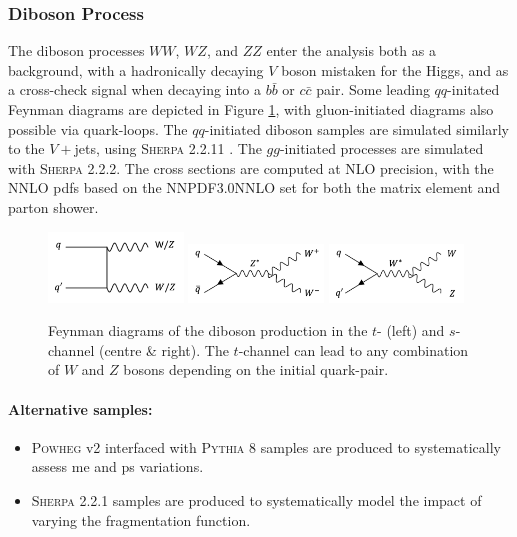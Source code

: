 \subsubsection{Diboson Process}
The diboson processes $WW$, $WZ$, and $ZZ$ enter the analysis both as a background, with a hadronically decaying $V$ boson mistaken for the Higgs, and as a cross-check signal when decaying into a $b\bar{b}$ or $c\bar{c}$ pair. Some leading $qq$-initated Feynman diagrams are depicted in Figure \ref{fig:feyndiV}, with gluon-initiated diagrams also possible via quark-loops. The $qq$-initiated diboson samples are simulated similarly to the $V+$jets, using \textsc{Sherpa} 2.2.11 \cite{10.21468/SciPostPhys.7.3.034}. The $gg$-initiated processes are simulated with \textsc{Sherpa} 2.2.2. The cross sections are computed at NLO precision, with the NNLO \glspl{pdf} based on the NNPDF3.0NNLO set \cite{PDFLHCrun2} for both the matrix element and parton shower.
\begin{figure}[h!]
  \center
  \includegraphics[width=0.32\textwidth]{Images/VH/Feynman/diboson.png}
  \includegraphics[width=0.32\textwidth]{Images/VH/Feynman/diW.png}
  \includegraphics[width=0.32\textwidth]{Images/VH/Feynman/diWZ.png}
  \caption{Feynman diagrams of the diboson production in the $t$- (left) and $s$-channel (centre \& right). The $t$-channel can lead to any combination of $W$ and $Z$ bosons depending on the initial quark-pair.}
  \label{fig:feyndiV}
\end{figure}

\paragraph{Alternative samples:}
\begin{itemize}
  \item \textsc{Powheg} v2 interfaced with \textsc{Pythia} 8 samples are produced to systematically assess \gls{me} and \gls{ps} variations. 
  \item \textsc{Sherpa} 2.2.1 samples are produced to systematically model the impact of varying the fragmentation function. 
\end{itemize}

